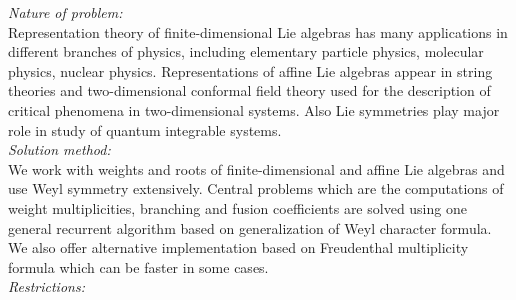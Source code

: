 \begin{small}
{\em Nature of problem:}\\
Representation theory of finite-dimensional Lie algebras has many applications in different branches of physics, including elementary particle physics, molecular physics, nuclear physics. Representations of affine Lie algebras appear in string theories and two-dimensional conformal field theory used for the description of critical phenomena in two-dimensional systems. Also Lie symmetries play major role in study of quantum integrable systems.
   \\
{\em Solution method:}\\
We work with weights and roots of finite-dimensional and affine Lie algebras and use Weyl symmetry extensively. Central problems which are the computations of weight multiplicities, branching and fusion coefficients are solved using one general recurrent algorithm based on generalization of Weyl character formula. We also offer alternative implementation based on Freudenthal multiplicity formula which can be faster in some cases.
   \\
{\em Restrictions:}\\

\end{small}
